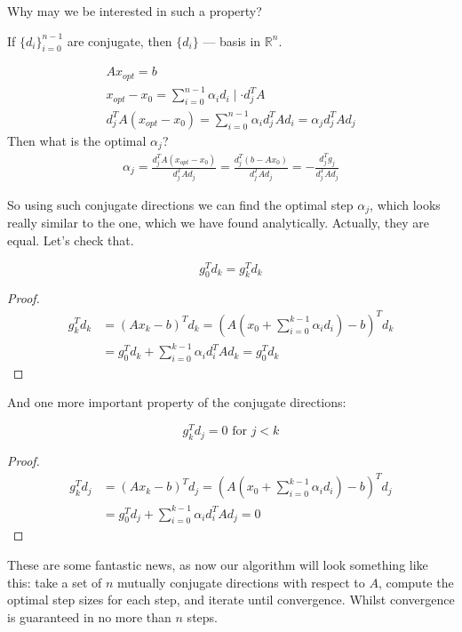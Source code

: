 Why may we be interested in such a property?

If $\{d_i\}^{n-1}_{i=0}$ are conjugate, then $\{d_i\}$ --- basis in $\mathbb{R}^n$.

\begin{gather*}
    A x_{opt} = b \\ 
    x_{opt} - x_0 = \sum^{n-1}_{i=0} \alpha_i d_i \mid \cdot d_j^T A \\
    d_j^T A (x_{opt} - x_0) = \sum^{n-1}_{i=0} \alpha_i d_j^T A d_i = \alpha_j d_j^T A d_j
\end{gather*}
Then what is the optimal $\alpha_j$?
\begin{gather*}
    \alpha_j = \frac{d_j^T A (x_{opt} - x_0)}{d_j^T A d_j} = \frac{d_j^T (b - A x_0)}{d_j^T A d_j} = - \frac{d_j^T g_j}{d_j^T A d_j}
\end{gather*}

So using such conjugate directions we can find the optimal step $\alpha_j$, which looks really similar to the one, which we have found analytically. Actually, they are equal. Let's check that. 

\begin{theorem}
    \[
        g_0^T d_k = g_k^T d_k
    \]
\end{theorem}
\begin{proof}
    \begin{align*}
        g_k^T d_k &= (A x_k - b)^T d_k = (A (x_0 + \sum^{k-1}_{i=0} \alpha_i d_i) - b)^T d_k \\
        &= g_0^T d_k + \sum^{k-1}_{i=0} \alpha_i d_i^T A d_k = g_0^T d_k
    \end{align*}
\end{proof}

And one more important property of the conjugate directions:
\begin{theorem}
    \[
        g_k^T d_j = 0 \text{ for } j < k
    \]
\end{theorem}
\begin{proof}
    \begin{align*}
        g_k^T d_j &= (A x_k - b)^T d_j = (A (x_0 + \sum^{k-1}_{i=0} \alpha_i d_i) - b)^T d_j \\
        &= g_0^T d_j + \sum^{k-1}_{i=0} \alpha_i d_i^T A d_j = 0
    \end{align*}
\end{proof} 

These are some fantastic news, as now our algorithm will look something like this: take a set of $n$ mutually conjugate directions with respect to $A$, compute the optimal step sizes for each step, and iterate until convergence. Whilst convergence is guaranteed in no more than $n$ steps.

